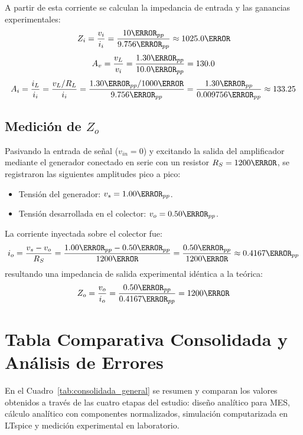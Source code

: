 A partir de esta corriente se calculan la impedancia de entrada y las ganancias experimentales:
\begin{equation}
  Z_i = \frac{v_i}{i_i} = \frac{10\mV_{pp}}{9.756\uA_{pp}} \approx 1025.0\ohm
\end{equation}
\begin{equation}
  A_v = \frac{v_L}{v_i} = \frac{1.30\V_{pp}}{10.0\mV_{pp}} = 130.0
\end{equation}
\begin{equation}
  A_i = \frac{i_L}{i_i} = \frac{v_L / R_L}{i_i} = \frac{1.30\V_{pp} / 1000\ohm}{9.756\uA_{pp}} = \frac{1.30\mA_{pp}}{0.009756\mA_{pp}} \approx 133.25
\end{equation}

\subsection{Medición de \texorpdfstring{$Z_o$}{Zo}}
Pasivando la entrada de señal ($v_{in} = 0$) y excitando la salida del amplificador mediante el generador conectado en
serie con un resistor $R_S = 1200\ohm$, se registraron las siguientes amplitudes pico a pico:
\begin{itemize}
  \item Tensión del generador: $v_s = 1.00\V_{pp}$.
  \item Tensión desarrollada en el colector: $v_o = 0.50\V_{pp}$.
\end{itemize}

La corriente inyectada sobre el colector fue:
\begin{equation}
  i_o = \frac{v_s - v_o}{R_S} = \frac{1.00\V_{pp} - 0.50\V_{pp}}{1200\ohm} = \frac{0.50\V_{pp}}{1200\ohm} \approx 0.4167\mA_{pp}
\end{equation}
resultando una impedancia de salida experimental idéntica a la teórica:
\begin{equation}
  Z_o = \frac{v_o}{i_o} = \frac{0.50\V_{pp}}{0.4167\mA_{pp}} = 1200\ohm
\end{equation}

\section{Tabla Comparativa Consolidada y Análisis de Errores}

En el Cuadro~\ref{tab:consolidada_general} se resumen y comparan los valores obtenidos a través de las cuatro etapas del
estudio: diseño analítico para MES, cálculo analítico con componentes normalizados, simulación computarizada en LTspice
y medición experimental en laboratorio.

